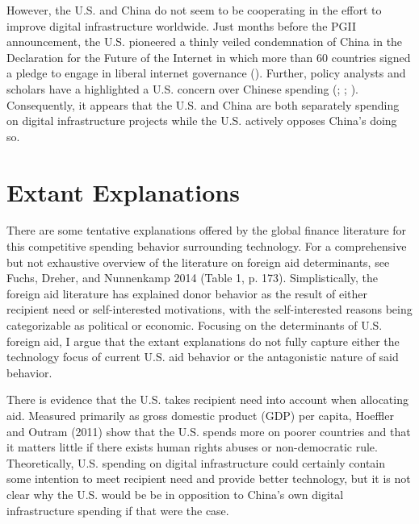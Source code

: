 \documentclass[12pt]{article}
\begin{document}
However, the U.S. and China do not seem to be cooperating in the effort to improve digital infrastructure worldwide. Just months before the PGII announcement, the U.S. pioneered a thinly veiled condemnation of China in the Declaration for the Future of the Internet in which more than 60 countries signed a pledge to engage in liberal internet governance (\cite{u.s.departmentofstate2022}). Further, policy analysts and scholars have a highlighted a U.S. concern over Chinese spending (\cite{hass2021}; \cite{triolo2020}; \cite{hillman2021}). Consequently, it appears that the U.S. and China are both separately spending on digital infrastructure projects while the U.S. actively opposes China's doing so.

\section*{Extant Explanations}
There are some tentative explanations offered by the global finance literature for this competitive spending behavior surrounding technology. For a comprehensive but not exhaustive overview of the literature on foreign aid determinants, see Fuchs, Dreher, and Nunnenkamp 2014 \nocite{fuchs2014} (Table 1, p. 173). Simplistically, the foreign aid literature has explained donor behavior as the result of either recipient need or self-interested motivations, with the self-interested reasons being categorizable as political or economic. Focusing on the determinants of U.S. foreign aid, I argue that the extant explanations do not fully capture either the technology focus of current U.S. aid behavior or the antagonistic nature of said behavior. 

There is evidence that the U.S. takes recipient need into account when allocating aid. Measured primarily as gross domestic product (GDP) per capita, Hoeffler and Outram (2011) \nocite{hoeffler2011} show that the U.S. spends more on poorer countries and that it matters little if there exists human rights abuses or non-democratic rule. Theoretically, U.S. spending on digital infrastructure could certainly contain some intention to meet recipient need and provide better technology, but it is not clear why the U.S. would be be in opposition to China's own digital infrastructure spending if that were the case. %
\end{document}
